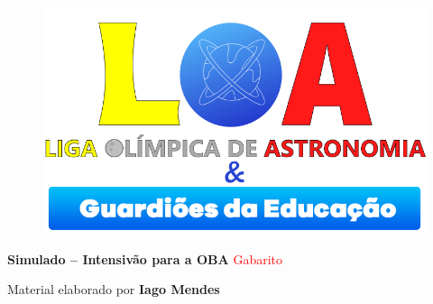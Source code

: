 \documentclass[a4paper, 12pt]{article}
\newcommand{\red}[1]{\textcolor{red}{#1}}
\begin{document}
    \begin{figure}
        \centering
        \href{https://ligaolimpicadeastronomia.com.br/}{\includegraphics[scale=0.6]{./img/logos.png}}
    \end{figure}
    \begin{center}
        \begin{large}
            \textbf{Simulado -- Intensivão para a OBA}
            \linebreak \red{Gabarito}
        \end{large}
        \end{center}
    \begin{flushright}
        Material elaborado por \textbf{Iago Mendes}
    \end{flushright}
\end{document}
